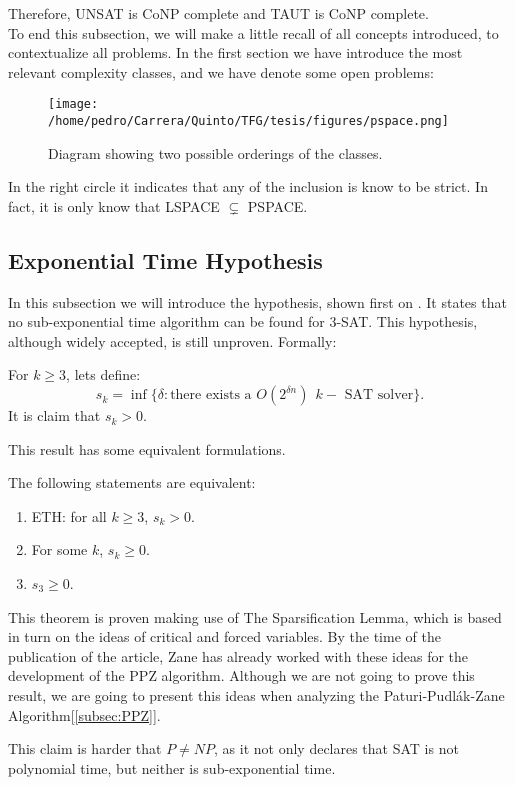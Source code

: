 Therefore, UNSAT is CoNP complete and TAUT is CoNP complete.\\

To end this subsection, we will make a little recall of all concepts introduced, to contextualize all problems. In the first section we have introduce the most relevant complexity classes, and we have denote some open problems:

\begin{figure}[h]
  \begin{center}
    \texttt{[image: /home/pedro/Carrera/Quinto/TFG/tesis/figures/pspace.png]}
    \caption{Diagram showing two possible orderings of the classes.}
  \end{center}
\end{figure} 

In the right circle it indicates that any of the inclusion is know to be strict. In fact, it is only know that LSPACE $\subsetneq$ PSPACE. 




\subsection{Exponential Time Hypothesis}
\label{hyp:exponential_time}
In this subsection we will introduce the hypothesis, shown first on \cite{impagliazzo2001complexity}. It states that no sub-exponential time algorithm can be found for 3-SAT. This hypothesis, although widely accepted, is still unproven. Formally:

\begin{definition}[ETH]
  For $k\ge 3$, lets define:
  $$s_k=\inf\{\delta: \text{there exists a } O(2^{\delta n})\ \ k-\text{ SAT solver}\}.$$
  It is claim that $s_k>0$.
\end{definition}

This result has some equivalent formulations.

\begin{proposition}
  The following statements are equivalent:
  \begin{enumerate}
  \item ETH: for all $k\ge 3$, $s_k > 0$.
  \item For some $k$, $s_k \ge 0$.
  \item $s_3 \ge 0$.

  \end{enumerate}
  \end{proposition}

This theorem is proven making use of The Sparsification Lemma, which is based in turn on the ideas of critical and forced variables. By the time of the publication of the article, Zane has already worked with these ideas for the development of the PPZ algorithm\cite{paturi1997satisfiability}. Although we are not going to prove this result, we are going to present this ideas when analyzing the Paturi-Pudlák-Zane Algorithm[\ref{subsec:PPZ}].
 
This claim is harder that $P\ne NP$, as it not only declares that SAT is not polynomial time, but neither is sub-exponential time. 







